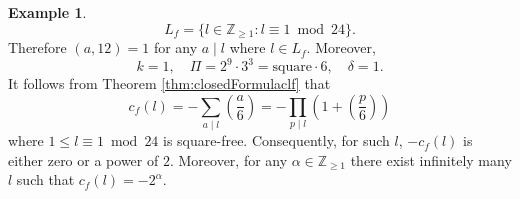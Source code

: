 \documentclass[12pt]{amsart}
\numberwithin{equation}{section}
\theoremstyle{plain}
\theoremstyle{definition}
\newtheorem{examp}[thm]{Example}
\theoremstyle{remark}
\newcommand\legendre[2]{\genfrac{(}{)}{}{}{#1}{#2}}
\newcommand\numgeq[2]{\mathbb{#1}_{\geq #2}}
\begin{document}
\begin{examp}
$$
L_f=\{l\in\numgeq{Z}{1}\colon l\equiv1\bmod{24}\}.
$$
Therefore $(a,12)=1$ for any $a\mid l$ where $l\in L_f$. Moreover,
\begin{equation*}
k=1,\quad\varPi=2^9\cdot3^3=\text{square}\cdot6,\quad\delta=1.
\end{equation*}
It follows from Theorem \ref{thm:closedFormulaclf} that
\begin{equation*}
c_f(l)=-\sum_{a\mid l}\legendre{a}{6}=-\prod_{p\mid l}\left(1+\legendre{p}{6}\right)
\end{equation*}
where $1\leq l\equiv1\bmod{24}$ is square-free. Consequently, for such $l$, $-c_f(l)$ is either zero or a power of $2$. Moreover, for any $\alpha\in\numgeq{Z}{1}$ there exist infinitely many $l$ such that $c_f(l)=-2^\alpha$.
\end{examp}
\end{document}
